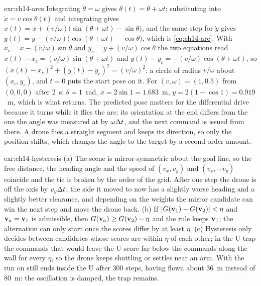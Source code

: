 \begin{solution}{exr:ch14-arcs}
Integrating $\dot\theta = \omega$ gives $\theta(t) = \theta + \omega t$; substituting into $\dot x = v\cos\theta(t)$ and integrating gives $x(t) = x + (v/\omega)\bigl(\sin(\theta + \omega t) - \sin\theta\bigr)$, and the same step for $\dot y$ gives $y(t) = y - (v/\omega)\bigl(\cos(\theta + \omega t) - \cos\theta\bigr)$, which is \cref{eq:ch14-arc}. With $x_c = x - (v/\omega)\sin\theta$ and $y_c = y + (v/\omega)\cos\theta$ the two equations read $x(t) - x_c = (v/\omega)\sin(\theta + \omega t)$ and $y(t) - y_c = -(v/\omega)\cos(\theta + \omega t)$, so $(x(t)-x_c)^2 + (y(t)-y_c)^2 = (v/\omega)^2$: a circle of radius $v/\omega$ about $(x_c, y_c)$, and $t = 0$ puts the start pose on it. For $(v, \omega) = (1, 0.5)$ from $(0,0,0)$ after $2$~s: $\theta = 1$~rad, $x = 2\sin 1 = 1.683$~m, $y = 2(1 - \cos 1) = 0.919$~m, which is what  returns. The predicted pose matters for the differential drive because it turns while it flies the arc: its orientation at the end differs from the one the angle was measured at by $\omega\Delta t$, and the next command is issued from there. A drone flies a straight segment and keeps its direction, so only the position shifts, which changes the angle to the target by a second-order amount.
\end{solution}
\begin{solution}{exr:ch14-hysteresis}
(a) The scene is mirror-symmetric about the goal line, so the free distance, the heading angle and the speed of $(v_x, v_y)$ and $(v_x, -v_y)$ coincide and the tie is broken by the order of the grid. After one step the drone is off the axis by $v_y\Delta t$; the side it moved to now has a slightly worse heading and a slightly better clearance, and depending on the weights the mirror candidate can win the next step and move the drone back. (b) If $\left\lvert G(\mathbf{v}_1) - G(\mathbf{v}_2) \right\rvert < \eta$ and $\mathbf{v}_a = \mathbf{v}_1$ is admissible, then $G(\mathbf{v}_a) \ge G(\mathbf{v}_2) - \eta$ and the rule keeps $\mathbf{v}_1$; the alternation can only start once the scores differ by at least $\eta$. (c) Hysteresis only decides between candidates whose scores are within $\eta$ of each other; in the U-trap the commands that would leave the U score far below the commands along the wall for every $\eta$, so the drone keeps shuttling or settles near an arm. With  the run on  still ends inside the U after 300 steps, having flown about 36~m instead of 80~m: the oscillation is damped, the trap remains.
\end{solution}
